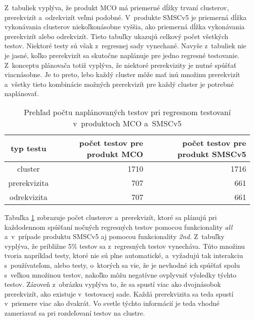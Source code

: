 Z~tabuliek vyplýva, že produkt MCO má priemerné dĺžky trvaní clusterov, 
prerekvizít a~odrekvizít veľmi podobné. V~produkte SMSCv5 je priemerná
dĺžka vykonávania clusterov niekoľkonásobne vyššia, ako priemerná dĺžka 
vykonávania prerekvizít alebo odrekvizít.
Tieto tabuľky ukazujú celkový počet všetkých testov. 
Niektoré testy sú však z~regresnej sady vynechané.
Navyše z~tabuliek nie je jasné, koľko prerekvizít sa skutočne naplánuje 
pre jedno regresné testovanie. Z~konceptu plánovača totiž vyplýva, že niektoré 
prerekvizity je nutné spúšťať viacnásobne.
Je to preto, lebo každý cluster môže mať inú množinu prerekvizít
a~všetky tieto kombinácie možných prerekvizít pre každý cluster
je potrebné naplánovať.

\begin{table}
  \begin{center}
    \begin{tabular}{| c | r | r |}
    \hline
    typ testu    & počet testov pre produkt MCO & 
    počet testov pre produkt SMSCv5 \\ \hline
    cluster      & 1710 & 1716 \\ \hline
    prerekvizita & 707  & 661  \\ \hline
    odrekvizita  & 707  & 661 \\
    \hline
    \end{tabular}
    \caption{Prehľad počtu naplánovaných testov pri regresnom testovaní 
             v~produktoch MCO a~SMSCv5}
    \label{tabulka:pocet_naplanovanych_testov}
  \end{center}
\end{table}

Tabuľka \ref{tabulka:pocet_naplanovanych_testov} zobrazuje počet 
clusterov a~prerekvizít, ktoré sa plánujú pri každodennom spúšťaní 
nočných regresných testov pomocou funkcionality \textit{all} a~v~prípade produktu 
SMSCv5 aj pomocou funkcionality \textit{2nd}. Z~tabuľky vyplýva, že 
približne 5\% testov sa z~regresných testov vynecháva. 
Túto množinu tvoria napríklad testy, ktoré nie sú plne automatické, 
a~vyžadujú tak interakciu s~používateľom, alebo testy, o~ktorých sa vie, 
že je nevhodné ich spúšťať spolu s~veľkou množinou testov, 
nakoľko môžu negatívne ovplyvniť výsledky týchto testov.
Zároveň z~obrázku vyplýva to, že sa spustí viac ako dvojnásobok 
prerekvizít, ako existuje v~testovacej sade. Každá prerekvizita sa teda 
spustí v~priemere viac ako dvakrát. Vo svetle týchto informácií je teda 
vhodné zameriavať sa pri rozdeľovaní testov na clustre.

